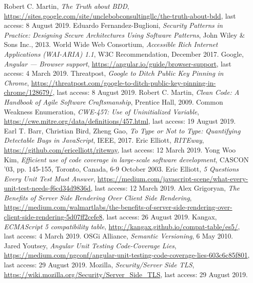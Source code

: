 \documentclass{article} %
\begin{document}
\begin{thebibliography}{9}
Robert C. Martin, \emph{The Truth about BDD}, \url{https://sites.google.com/site/unclebobconsultingllc/the-truth-about-bdd}, last access: 8 August 2019.
Eduardo Fernandez-Buglioni, \emph{Security Patterns in Practice: Designing Secure Architectures Using Software Patterns}, John Wiley \& Sons Inc., 2013.
World Wide Web Consortium, \emph{Accessible Rich Internet Applications (WAI-ARIA) 1.1}, W3C Recommendation, December 2017.
Google, \emph{Angular --- Browser support}, \url{https://angular.io/guide/browser-support}, last access: 4 March 2019.
Threatpost, \emph{Google to Ditch Public Key Pinning in Chrome}, \url{https://threatpost.com/google-to-ditch-public-key-pinning-in-chrome/128679/}, last access: 8 August 2019.
Robert C. Martin, \emph{Clean Code: A Handbook of Agile Software Craftsmanship}, Prentice Hall, 2009.
Common Weakness Enumeration, \emph{CWE-457: Use of Uninitialized Variable}, \url{https://cwe.mitre.org/data/definitions/457.html}, last access: 19 August 2019.
Earl T. Barr, Christian Bird, Zheng Gao, \emph{To Type or Not to Type: Quantifying Detectable Bugs in JavaScript}, IEEE, 2017.
Eric Elliott, \emph{RITEway}, \url{https://github.com/ericelliott/riteway}, last access: 12 March 2019.
Yong Woo Kim, \emph{Efficient use of code coverage in large-scale software development}, CASCON '03, pp. 145-155, Toronto, Canada, 6-9 October 2003.
Eric Elliott, \emph{5 Questions Every Unit Test Must Answer}, \url{https://medium.com/javascript-scene/what-every-unit-test-needs-f6cd34d9836d}, last access: 12 March 2019.
Alex Grigoryan, \emph{The Benefits of Server Side Rendering Over Client Side Rendering}, \url{https://medium.com/walmartlabs/the-benefits-of-server-side-rendering-over-client-side-rendering-5d07ff2cefe8}, last access: 26 August 2019.
Kangax, \emph{ECMAScript 5 compatibility table}, \url{http://kangax.github.io/compat-table/es5/}, last access: 4 March 2019.
OSGi Alliance, \emph{Semantic Versioning}, 6 May 2010.
Jared Youtsey, \emph{Angular Unit Testing Code-Coverage Lies}, \url{https://medium.com/ngconf/angular-unit-testing-code-coverage-lies-603c6c85f801}, last access: 29 August 2019.
Mozilla, \emph{Security/Server Side TLS}, \url{https://wiki.mozilla.org/Security/Server_Side_TLS}, last access: 29 August 2019.

\end{thebibliography}
\end{document}
